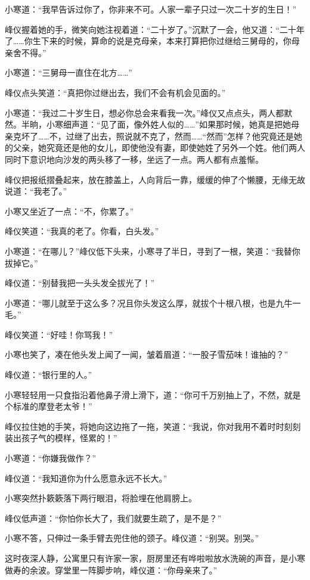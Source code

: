 \par 小寒道：“我早告诉过你了，你非来不可。人家一辈子只过一次二十岁的生日！”
\par 峰仪握着她的手，微笑向她注视着道：“二十岁了。”沉默了一会，他又道：“二十年了……你生下来的时候，算命的说是克母亲，本来打算把你过继给三舅母的，你母亲舍不得。”
\par 小寒道：“三舅母一直住在北方……”
\par 峰仪点头笑道：“真把你过继出去，我们不会有机会见面的。”
\par 小寒道：“我过二十岁生日，想必你总会来看我一次。”峰仪又点点头，两人都默然。半晌，小寒细声道：“见了面，像外姓人似的……”如果那时候，她真是把她母亲克坏了……不，过继了出去，照说就不克了，然而……“然而”怎样？他究竟还是她的父亲，她究竟还是他的女儿，即使他没有妻，即使她姓了另外一个姓。他们两人同时下意识地向沙发的两头移了一移，坐远了一点。两人都有点羞惭。
\par 峰仪把报纸摺叠起来，放在膝盖上，人向背后一靠，缓缓的伸了个懒腰，无缘无故说道：“我老了。”
\par 小寒又坐近了一点：“不，你累了。”
\par 峰仪笑道：“我真的老了。你看，白头发。”
\par 小寒道：“在哪儿？”峰仪低下头来，小寒寻了半日，寻到了一根，笑道：“我替你拔掉它。”
\par 峰仪道：“别替我把一头头发全拔光了！”
\par 小寒道：“哪儿就至于这么多？况且你头发这么厚，就拔个十根八根，也是九牛一毛。”
\par 峰仪笑道：“好哇！你骂我！”
\par 小寒也笑了，凑在他头发上闻了一闻，皱着眉道：“一股子雪茄味！谁抽的？”
\par 峰仪道：“银行里的人。”
\par 小寒轻轻用一只食指沿着他鼻子滑上滑下，道：“你可千万别抽上了，不然，就是个标准的摩登老太爷！”
\par 峰仪拉住她的手笑，将她向这边拖了一拖，笑道：“我说，你对我用不着时时刻刻装出孩子气的模样，怪累的！”
\par 小寒道：“你嫌我做作？”
\par 峰仪道：“我知道你为什么愿意永远不长大。”
\par 小寒突然扑簌簌落下两行眼泪，将脸埋在他肩膀上。
\par 峰仪低声道：“你怕你长大了，我们就要生疏了，是不是？”
\par 小寒不答，只伸过一条手臂去兜住他的颈子。峰仪道：“别哭。别哭。”
\par 这时夜深人静，公寓里只有许家一家，厨房里还有哗啦啦放水洗碗的声音，是小寒做寿的余波。穿堂里一阵脚步响，峰仪道：“你母亲来了。”
